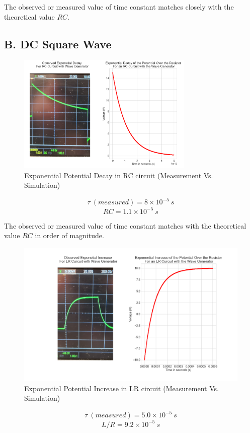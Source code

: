 \documentclass[a4paper,12pt]{article}
\begin{document}
The observed or measured value of time constant matches closely with the theoretical value $RC$. 

\subsection*{B. DC Square Wave}

\begin{figure}[H]
  \centerline{\includegraphics[width=0.75\textwidth]{../Simulated Curves/RC_W-mod.png}}
  \caption{Exponential Potential Decay in RC circuit (Measurement Vs. Simulation)}
  \label{Combined_RC_W}
\end{figure}
$$\tau\ (measured) = 8 \times 10^{-5}\ s$$
$$RC = 1.1 \times 10^{-5}\ s$$

The observed or measured value of time constant matches with the theoretical value $RC$ in order of magnitude. 

\begin{figure}[H]
  \centerline{\includegraphics[width=0.9\linewidth]{../Simulated Curves/LR_W-mod.png}}
  \caption{Exponential Potential Increase in LR circuit (Measurement Vs. Simulation)}
  \label{Combined_LR_W}
\end{figure}
$$\tau\ (measured) = 5.0 \times 10^{-5}\ s$$
$$L/R = 9.2 \times 10^{-5}\ s$$
\end{document}
